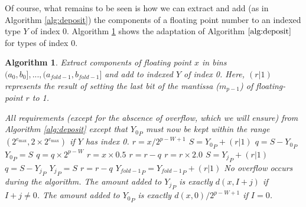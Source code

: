 \documentclass[12pt]{article}
\providecommand{\max}{\ensuremath{\text{max}}}
\providecommand{\To}{\ensuremath{\text{ to }}}
\theoremstyle{plain}
\newtheorem{alg}{Algorithm}[section]
\numberwithin{equation}{section}
\begin{document}
      Of course, what remains to be seen is how we can extract and add (as in Algorithm \ref{alg:deposit}) the components of a floating point number to an indexed type $Y$ of index 0. Algorithm \ref{alg:deposit0} shows the adaptation of Algorithm $\ref{alg:deposit}$ for types of index 0.
      \begin{alg}
        Extract components of floating point $x$ in bins $(a_0, b_0], ..., (a_{fold - 1}, b_{fold - 1}]$ and add to indexed $Y$ of index 0. Here, $(r | 1)$ represents the result of setting the last bit of the mantissa ($m_{p - 1}$) of floating-point $r$ to 1.
        \begin{algorithmic}[1]
          \Require
            \Statex All requirements (except for the abscence of overflow, which we will ensure) from Algorithm \ref{alg:deposit} except that ${Y_0}_P$ must now be kept within the range $(2^{e_{\max}}, 2 \times 2^{e_{\max}})$ if $Y$ has index 0.
              \State $r = x / 2^{p - W + 1}$
              \State $S = {Y_0}_P + (r | 1)$
              \State $q = S - {Y_0}_P$
              \State ${Y_0}_P = S$
              \State $q = q \times 2^{p - W}$
              \State $r = x \times 0.5$ \label{alg:deposit0:halfx}
              \State $r = r - q$ \label{alg:deposit0:formr}
              \State $r = r \times 2.0$ \label{alg:deposit0:formrtwice}
              \For{$j = 1 \To (fold - 2)$}
                \State $S = {Y_j}_P + (r | 1)$
                \State $q = S - {Y_j}_P$
                \State ${Y_j}_P = S$
                \State $r = r - q$
              \EndFor
              \State ${Y_{fold - 1}}_P = {Y_{fold - 1}}_P + (r | 1)$
            \Else
              \State{}
            \EndIf
          \EndFunction
          \Ensure
            \Statex No overflow occurs during the algorithm.
            \Statex The amount added to ${Y_j}_P$ is exactly $d(x, I + j)$ if $I + j \neq 0$.
            \Statex The amount added to ${Y_0}_P$ is exactly $d(x, 0)/2^{p - W + 1}$ if $I = 0$.
        \end{algorithmic}
        \label{alg:deposit0}
      \end{alg}
\end{document}
